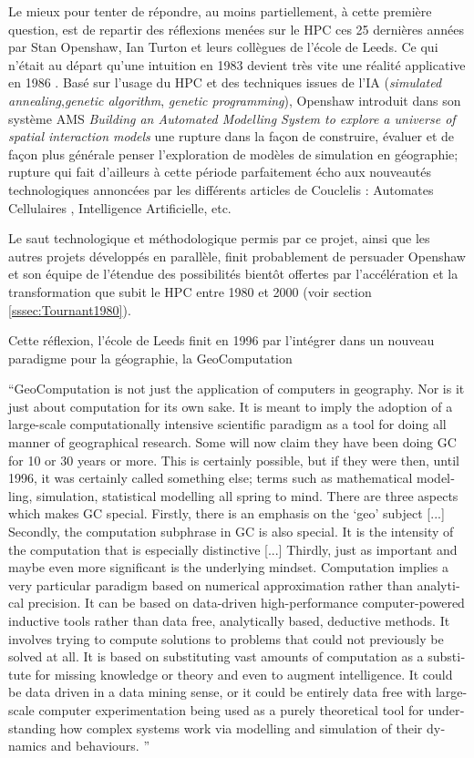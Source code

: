 Le mieux pour tenter de répondre, au moins partiellement, à cette première question, est de repartir des réflexions menées sur le HPC ces 25 dernières années par Stan Openshaw, Ian Turton et leurs collègues de l'école de Leeds. Ce qui n'était au départ qu'une intuition en 1983  devient très vite une réalité applicative en 1986 \autocite{Openshaw1988}. Basé sur l'usage du HPC et des techniques issues de l'IA (\textit{simulated annealing},\textit{genetic algorithm}, \textit{genetic programming}), Openshaw introduit dans son système AMS \textit{Building an Automated Modelling System to explore a universe of spatial interaction models} une rupture dans la façon de construire, évaluer et de façon plus générale penser l'exploration de modèles de simulation en géographie; rupture qui fait d'ailleurs à cette période parfaitement écho aux nouveautés technologiques annoncées par les différents articles de Couclelis : Automates Cellulaires \autocite{Couclelis1985}, Intelligence Artificielle, etc. \autocite{Couclelis1986}

Le saut technologique et méthodologique permis par ce projet, ainsi que les autres projets développés en parallèle, finit probablement de persuader Openshaw et son équipe de l'étendue des possibilités bientôt offertes par l'accélération et la transformation que subit le HPC entre 1980 et 2000 (voir section \ref{sssec:Tournant1980}).

Cette réflexion, l'école de Leeds finit en 1996 par l'intégrer dans un nouveau paradigme pour la géographie, la GeoComputation \autocite[4]{Openshaw2000b}

\foreignquote{english}{GeoComputation is not just the application of computers in geography. Nor is it just about computation for its own sake. It is meant to imply the adoption of a large-scale computationally intensive scientific paradigm as a tool for doing all manner of geographical research. Some will now claim they have been doing GC for 10 or 30 years or more. This is certainly possible, but if they were then, until 1996, it was certainly called something else; terms such as mathematical modelling, simulation, statistical modelling all spring to mind. There are three aspects which makes GC special. Firstly, there is an emphasis on the ‘geo’ subject [...] Secondly, the computation subphrase in GC is also special. It is the intensity of the computation that is especially distinctive [...] Thirdly, just as important and maybe even more significant is the underlying mindset. Computation implies a very particular paradigm based on numerical approximation rather than analytical precision. It can be based on data-driven high-performance computer-powered inductive tools rather than data free, analytically based, deductive methods. It involves trying to compute solutions to problems that could not previously be solved at all. It is based on substituting vast amounts of  computation as a substitute for missing knowledge or theory and even to augment intelligence. It could be data driven in a data mining sense, or it could be entirely data free with large-scale computer experimentation being used as a purely theoretical tool for understanding how complex systems work via modelling and simulation of their dynamics and behaviours. }

